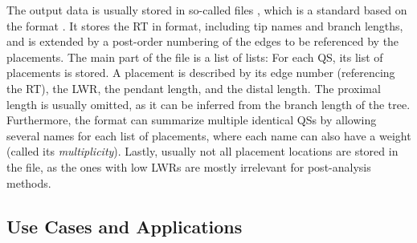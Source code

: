 The output data is usually stored in so-called  files \cite{Matsen2012},
which is a standard based on the  format \cite{JsonMemo,JsonStandard}.
It stores the \ac{RT} in  format, including tip names and branch lengths,
and is extended by a post-order numbering of the edges to be referenced by the placements.
The main part of the file is a list of lists:
For each \ac{QS}, its list of placements is stored.
A placement is described by its edge number (referencing the \ac{RT}),
the \ac{LWR}, the pendant length, and the distal length.
The proximal length is usually omitted, as it can be inferred from the branch length of the tree.
Furthermore, the format can summarize multiple identical \acp{QS}
by allowing several names for each list of placements,
where each name can also have a weight (called its \emph{multiplicity}).
Lastly, usually not all placement locations are stored in the file,
as the ones with low \acp{LWR} are mostly irrelevant for post-analysis methods.




\subsection{Use Cases and Applications}
\label{ch:Foundations:sec:PhylogeneticPlacement:sub:UseCasesApplications}

